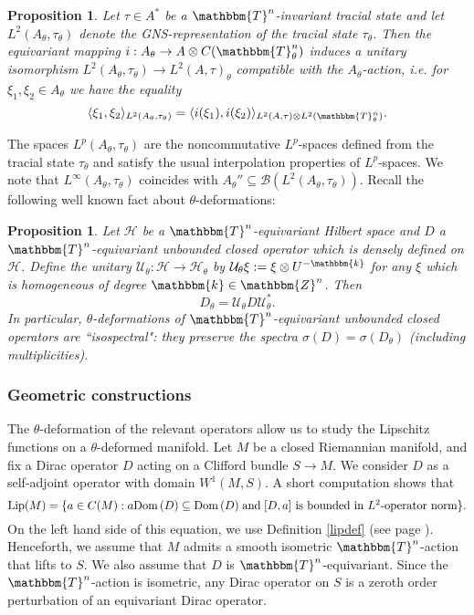 \documentclass[10pt]{amsart}
\newtheorem{prop}[thm]{Proposition}
\theoremstyle{remark}
\theoremstyle{definition}
\begin{document}
\begin{prop}
Let $\tau\in A^*$ be a ${\mathbbm{T}}^n$-invariant tracial state and let $L^2(A_\theta,\tau_\theta)$ denote the GNS-representation of the tracial state $\tau_\theta$. Then the equivariant mapping $i:A_\theta\to A\otimes C({\mathbbm{T}}^n_\theta)$ induces a unitary isomorphism $L^2(A_\theta,\tau_\theta)\to L^2(A,\tau)_\theta$ compatible with the $A_\theta$-action, i.e. for $\xi_1,\xi_2\in A_\theta$ we have the equality
$$\langle \xi_1,\xi_2\rangle_{L^2(A_\theta,\tau_\theta)}=\langle i(\xi_1),i(\xi_2)\rangle_{L^2(A,\tau)\otimes L^2({\mathbbm{T}}^n_\theta)}.$$
\end{prop}

The spaces $L^p(A_\theta,\tau_\theta)$ are the noncommutative $L^p$-spaces defined from the tracial state $\tau_\theta$ and satisfy the usual interpolation properties of $L^p$-spaces. We note that $L^\infty(A_\theta,\tau_\theta)$ coincides with $A_\theta''\subseteq {\mathcal{B}}(L^2(A_\theta,\tau_\theta))$. Recall the following well known fact about $\theta$-deformations:

\begin{prop}
\label{deformedequiop}
Let ${\mathcal{H}}$ be a ${\mathbbm{T}}^n$-equivariant Hilbert space and $D$ a ${\mathbbm{T}}^n$-equivariant unbounded closed operator which is densely defined on ${\mathcal{H}}$. Define the unitary $\mathcal{U}_\theta:{\mathcal{H}}\to {\mathcal{H}}_\theta$ by $\mathcal{U}_\theta\xi:=\xi\otimes U^{-\mathbbm{k}}$ for any $\xi$ which is homogeneous of degree $\mathbbm{k}\in {\mathbbm{Z}}^n$. Then 
$$D_\theta=\mathcal{U}_\theta D \mathcal{U}_\theta^*.$$
In particular, $\theta$-deformations of ${\mathbbm{T}}^n$-equivariant unbounded closed operators are ``isospectral": they preserve the spectra $\sigma(D)=\sigma(D_\theta)$ (including multiplicities).
\end{prop}

\subsubsection{Geometric constructions}
The $\theta$-deformation of the relevant operators allow us to study the Lipschitz functions on a $\theta$-deformed manifold. Let $M$ be a closed Riemannian manifold, and fix a Dirac operator $D$ acting on a Clifford bundle $S\to M$. We consider $D$ as a self-adjoint operator with domain $W^1(M,S)$. A short computation shows that 
$${\textnormal{Lip}}(M)=\{a\in C(M):a{\mathrm{Dom}\,}(D)\subseteq {\mathrm{Dom}\,}(D)\;\mbox{and} \; [D,a]\mbox{ is bounded in $L^2$-operator norm}\}.$$
On the left hand side of this equation, we use Definition \ref{lipdef} (see page \pageref{lipdef}). Henceforth, we assume that $M$ admits a smooth isometric ${\mathbbm{T}}^n$-action that lifts to $S$. We also assume that $D$ is ${\mathbbm{T}}^n$-equivariant. Since the ${\mathbbm{T}}^n$-action is isometric, any Dirac operator on $S$ is a zeroth order perturbation of an equivariant Dirac operator.
\end{document}
